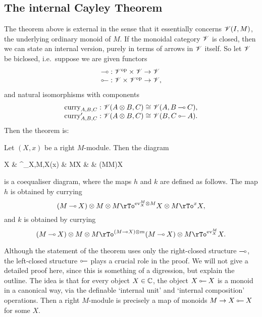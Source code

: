\documentclass{robinthesisdraft}
\begin{document}
% 
\subsection{The internal Cayley Theorem}
The theorem above is external in the sense that it essentially
concerns $\mathscr{V}(I, M)$, the underlying ordinary monoid of $M$. If
the monoidal category $\mathscr{V}$ is closed, then we can state an
internal version, purely in terms of arrows in $\mathscr{V}$ itself.
%
So let $\mathscr{V}$ be biclosed, i.e.\ suppose we are given
functors
\[\begin{array}{l}
	\lolli: \V\op\times\V\to\V \\
	\illol: \V\times\V\op\to\V,
\end{array}\]
and natural isomorphisms with components
\[\begin{array}{l}
	\curry_{A,B,C}:  \V(A\tn B, C) \cong \V(A, B\lolli C), \\
	\curry'_{A,B,C}: \V(A\tn B, C) \cong \V(B, C\illol A).
\end{array}\]
Then the theorem is:
\begin{thm}\label{thm-1d-internal}
	Let $(X,x)$ be a right $M$-module. Then the diagram
	\begin{diagram}
		X & \rTo^{\curry_{X,M,X}(x)} & M\lolli X & 
		 & (M\tn M)\lolli X
	\end{diagram}
	is a coequaliser diagram, where the maps $h$ and $k$ are defined as
	follows. The map $h$ is obtained by currying
	\[
		(M\lolli X)\tn M\tn M \rTo^{\ev^{M}_{X}\tn M} X\tn M \rTo^{x} X,
	\]
	and $k$ is obtained by currying
	\[
		(M\lolli X)\tn M\tn M \rTo^{(M\lolli X)\tn m} (M\lolli X)\tn M \rTo^{\ev^{M}_{X}} X.
	\]
\end{thm}
%
Although the statement of the theorem uses only the right-closed
structure $\mathbin{\multimap}$, the left-closed structure $\illol$ plays a
crucial role in the proof. We will not give a detailed proof here,
since this is something of a digression, but explain the outline.
The idea is that for every object $X\in\mathbb{C}$, the object $X\illol X$
is a monoid in a canonical way, via the definable `internal unit'
and `internal composition' operations. Then a right $M$-module is
precisely a map of monoids $M\to X\illol X$ for some $X$. \foo
\end{document}
